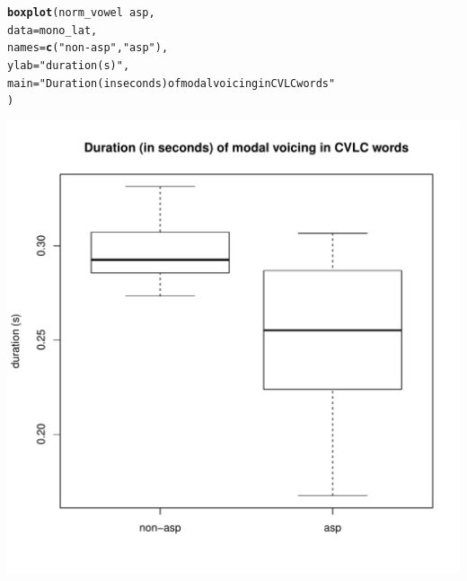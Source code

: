 \documentclass[a4paper,11pt]{article}\usepackage[]{graphicx}\usepackage[]{color}
\makeatletter
\def\maxwidth{ %
  \ifdim\Gin@nat@width>\linewidth
    \linewidth
  \else
    \Gin@nat@width
  \fi
}
\newcommand{\hlstr}[1]{\textcolor[rgb]{0.192,0.494,0.8}{#1}}%
\newcommand{\hlopt}[1]{\textcolor[rgb]{0,0,0}{#1}}%
\newcommand{\hlstd}[1]{\textcolor[rgb]{0.345,0.345,0.345}{#1}}%
\newcommand{\hlkwc}[1]{\textcolor[rgb]{0.333,0.667,0.333}{#1}}%
\newcommand{\hlkwd}[1]{\textcolor[rgb]{0.737,0.353,0.396}{\textbf{#1}}}%
\newenvironment{kframe}{%
 \def\at@end@of@kframe{}%
 \ifinner\ifhmode%
  \def\at@end@of@kframe{\end{minipage}}%
  \begin{minipage}{\columnwidth}%
 \fi\fi%
 \def\FrameCommand##1{\hskip\@totalleftmargin \hskip-\fboxsep
 \colorbox{shadecolor}{##1}\hskip-\fboxsep
     \hskip-\linewidth \hskip-\@totalleftmargin \hskip\columnwidth}%
 \MakeFramed {\advance\hsize-\width
   \@totalleftmargin\z@ \linewidth\hsize
   \@setminipage}}%
 {\par\unskip\endMakeFramed%
 \at@end@of@kframe}
\newenvironment{knitrout}{}{} %
\makeatother
\begin{document}
\begin{knitrout}
\end{knitrout}

\begin{knitrout}
\color{fgcolor}\begin{kframe}
\begin{alltt}
\hlkwd{boxplot}\hlstd{(norm_vowel} \hlopt{~} \hlstd{asp,}
        \hlkwc{data} \hlstd{= mono_lat,}
        \hlkwc{names} \hlstd{=} \hlkwd{c}\hlstd{(}\hlstr{"non-asp"}\hlstd{,} \hlstr{"asp"}\hlstd{),}
        \hlkwc{ylab} \hlstd{=} \hlstr{"duration (s)"}\hlstd{,}
        \hlkwc{main} \hlstd{=} \hlstr{"Duration (in seconds) of modal voicing in CVLC words"}
        \hlstd{)}
\end{alltt}
\end{kframe}
\includegraphics[width=\maxwidth]{img/mono-lat-box-1} 

\end{knitrout}
\end{document}
